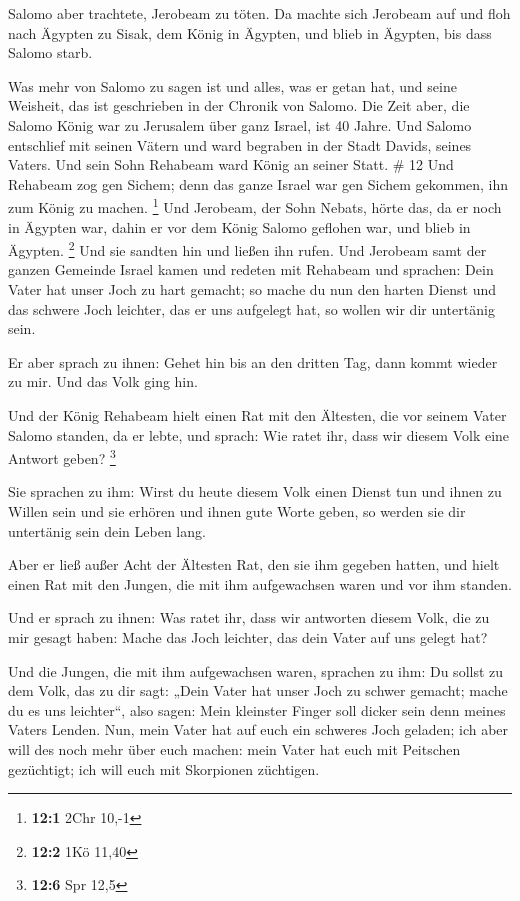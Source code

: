  Salomo aber trachtete, Jerobeam zu töten. Da machte sich
Jerobeam auf und floh nach Ägypten zu Sisak, dem König in Ägypten, und
blieb in Ägypten, bis dass Salomo starb.

 Was mehr von Salomo zu sagen ist und alles, was er getan
hat, und seine Weisheit, das ist geschrieben in der Chronik von Salomo.
 Die Zeit aber, die Salomo König war zu Jerusalem über ganz
Israel, ist 40 Jahre.  Und Salomo entschlief mit seinen
Vätern und ward begraben in der Stadt Davids, seines Vaters. Und sein
Sohn Rehabeam ward König an seiner Statt. \# 12  Und
Rehabeam zog gen Sichem; denn das ganze Israel war gen Sichem gekommen,
ihn zum König zu machen. \footnote{\textbf{12:1} 2Chr 10,-1}
 Und Jerobeam, der Sohn Nebats, hörte das, da er noch in
Ägypten war, dahin er vor dem König Salomo geflohen war, und blieb in
Ägypten. \footnote{\textbf{12:2} 1Kö 11,40}  Und sie sandten
hin und ließen ihn rufen. Und Jerobeam samt der ganzen Gemeinde Israel
kamen und redeten mit Rehabeam und sprachen:  Dein Vater hat
unser Joch zu hart gemacht; so mache du nun den harten Dienst und das
schwere Joch leichter, das er uns aufgelegt hat, so wollen wir dir
untertänig sein.

 Er aber sprach zu ihnen: Gehet hin bis an den dritten Tag,
dann kommt wieder zu mir. Und das Volk ging hin.

 Und der König Rehabeam hielt einen Rat mit den Ältesten,
die vor seinem Vater Salomo standen, da er lebte, und sprach: Wie ratet
ihr, dass wir diesem Volk eine Antwort geben? \footnote{\textbf{12:6}
  Spr 12,5}

 Sie sprachen zu ihm: Wirst du heute diesem Volk einen
Dienst tun und ihnen zu Willen sein und sie erhören und ihnen gute Worte
geben, so werden sie dir untertänig sein dein Leben lang.

 Aber er ließ außer Acht der Ältesten Rat, den sie ihm
gegeben hatten, und hielt einen Rat mit den Jungen, die mit ihm
aufgewachsen waren und vor ihm standen.

 Und er sprach zu ihnen: Was ratet ihr, dass wir antworten
diesem Volk, die zu mir gesagt haben: Mache das Joch leichter, das dein
Vater auf uns gelegt hat?

 Und die Jungen, die mit ihm aufgewachsen waren, sprachen
zu ihm: Du sollst zu dem Volk, das zu dir sagt: „Dein Vater hat unser
Joch zu schwer gemacht; mache du es uns leichter``, also sagen: Mein
kleinster Finger soll dicker sein denn meines Vaters Lenden.
 Nun, mein Vater hat auf euch ein schweres Joch geladen;
ich aber will des noch mehr über euch machen: mein Vater hat euch mit
Peitschen gezüchtigt; ich will euch mit Skorpionen züchtigen.

